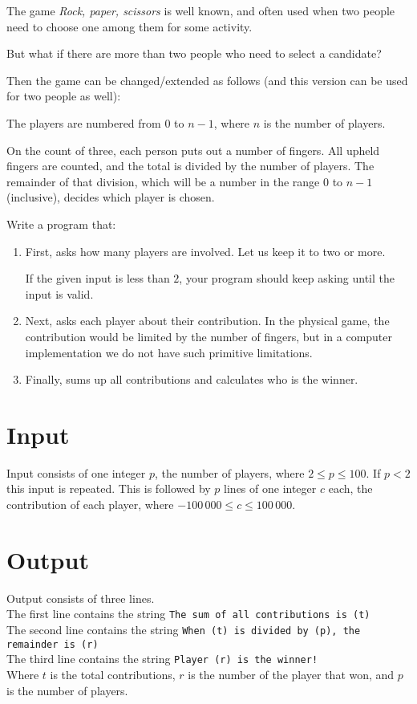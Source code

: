 
The game \emph{Rock, paper, scissors} is well known,
and often used when two people need to choose one among them
for some activity.

But what if there are more than two people who need to select a candidate?

Then the game can be changed/extended as follows
(and this version can be used for two people as well):

The players are numbered from $0$ to $n-1$,
where $n$ is the number of players.

On the count of three, each person puts out a number of fingers.
All upheld fingers are counted,
and the total is divided by the number of players.
The remainder of that division,
which will be a number in the range $0$ to $n-1$ (inclusive),
decides which player is chosen.

Write a program that:
\begin{enumerate}

\item First, asks how many players are involved.
Let us keep it to two or more.

If the given input is less than $2$,
your program should keep asking until the input is valid.

\item Next, asks each player about their contribution.
In the physical game,
the contribution would be limited by the number of fingers,
but in a computer implementation we do not have such primitive limitations.

\item Finally, sums up all contributions and calculates who is the winner.

\end{enumerate}

\section*{Input}
Input consists of one integer $p$, the number of players, where $ 2 \leq p \leq 100$. If $p < 2$ this input is repeated.
This is followed by $p$ lines of one integer $c$ each, the contribution of each player, where $ -100\,000 \leq c \leq 100\,000$.

\section*{Output}
Output consists of three lines.\\
The first line contains the string \texttt{The sum of all contributions is (t)}\\
The second line contains the string \texttt{When (t) is divided by (p), the remainder is (r)}\\
The third line contains the string \texttt{Player (r) is the winner!}\\
Where $t$ is the total contributions, $r$ is the number of the player that won, and $p$ is the number of players.


